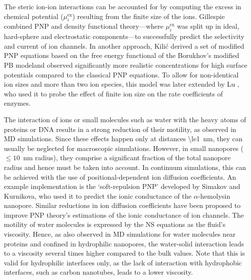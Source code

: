 \documentclass[journal=ancac3,manuscript=article,etalmode=truncate,maxauthors=0,layout=onecolumn]{achemso}
\begin{document}
The steric ion-ion interactions can be accounted for by computing the excess in chemical potential
($\mu_{i}^\text{ex}$) resulting from the finite size of the ions.\cite{Eisenberg-1996,Bazant-2009,
Daiguji-2010} Gillespie \etal{} combined PNP and density functional theory---where $\mu_{i}^\text{ex}$ was
split up in ideal, hard-sphere and electrostatic components---to successfully predict the selectivity and
current of ion channels.\cite{Gillespie-2002} In another approach, Kili\'{c} \etal{} derived a set of modified
PNP equations based on the free energy functional of the Borukhov's modified PB model\cite{Borukhov-1997}and
observed significantly more realistic concentrations for high surface potentials compared to the classical PNP
equations.\cite{Kilic-2007} To allow for non-identical ion sizes and more than two ion species, this model was
later extended by Lu \etal{}, who used it to probe the effect of finite ion size on the rate coefficients of
enzymes.\cite{Lu-2011}

The interaction of ions or small molecules such as water with the heavy atoms of proteins or DNA results in a
strong reduction of their motility, as observed in MD simulations.\cite{Makarov-1998,Pronk-2014} Since these
effects happen only at distances \SI{\le1}{\nm}, they can usually be neglected for macroscopic simulations.
However, in small nanopores ($\le10$~nm radius), they comprise a significant fraction of the total nanopore
radius and hence must be taken into account.\cite{Noskov-2004,Simakov-2010,Pederson-2015,McMullen-2017} In
continuum simulations, this can be achieved with the use of positional-dependent ion diffusion coefficients.
An example implementation is the `soft-repulsion PNP' developed by Simakov and Kurnikova,\cite{Simakov-2010,
Simakov-2018} who used it to predict the ionic conductance of the $\alpha$-hemolysin nanopore. Similar
reductions in ion diffusion coefficients have been proposed to improve PNP theory's estimations of the ionic
conductance of ion channels.\cite{Furini-2006,Liu-2015} The motility of water molecules is expressed by the NS
equations as the fluid's viscosity. Hence, as also observed in MD simulations for water molecules near
proteins\cite{Pronk-2014} and confined in hydrophilic nanopores,\cite{Qiao-Aluru-2003,Vo-2016,Hsu-2017} the
water-solid interaction leads to a viscosity several times higher compared to the bulk values. Note that this
is valid for hydrophilic interfaces only, as the lack of interaction with hydrophobic interfaces, such as
carbon nanotubes, leads to a lower viscosity.\cite{Ye-2011}
\end{document}
